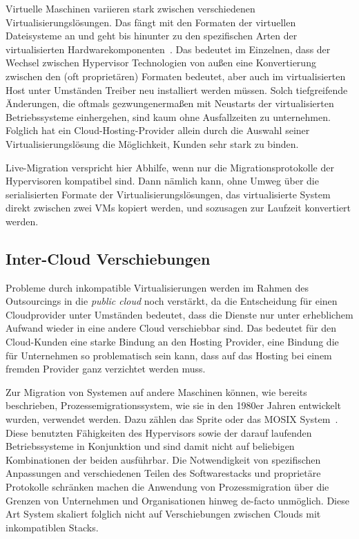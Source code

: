 Virtuelle Maschinen variieren stark zwischen verschiedenen
Virtualisierungslösungen. Das fängt mit den Formaten der virtuellen
Dateisysteme an und geht bis hinunter zu den spezifischen Arten der
virtualisierten Hardwarekomponenten~\cite{nelson2005fast}. Das
bedeutet im Einzelnen, dass der Wechsel zwischen Hypervisor
Technologien von außen eine Konvertierung zwischen den (oft
proprietären) Formaten bedeutet, aber auch im virtualisierten Host
unter Umständen Treiber neu installiert werden müssen. Solch
tiefgreifende Änderungen, die oftmals gezwungenermaßen mit Neustarts
der virtualisierten Betriebssysteme einhergehen, sind kaum ohne
Ausfallzeiten zu unternehmen. Folglich hat ein Cloud-Hosting-Provider
allein durch die Auswahl seiner Virtualisierungslösung die
Möglichkeit, Kunden sehr stark zu binden.

Live-Migration verspricht hier Abhilfe, wenn nur die
Migrationsprotokolle der Hypervisoren kompatibel sind. Dann nämlich
kann, ohne Umweg über die serialisierten Formate der
Virtualisierungslösungen, das virtualisierte System direkt zwischen
zwei \acp{VM} kopiert werden, und sozusagen zur Laufzeit konvertiert
werden.

\subsection{Inter-Cloud Verschiebungen}
\label{sec:movclouds}
Probleme durch inkompatible Virtualisierungen werden im Rahmen des
Outsourcings in die \emph{public cloud} noch verstärkt, da die
Entscheidung für einen Cloudprovider unter Umständen bedeutet, dass
die Dienste nur unter erheblichem Aufwand wieder in eine andere Cloud
verschiebbar sind. Das bedeutet für den Cloud-Kunden eine starke
Bindung an den Hosting Provider, eine Bindung die für Unternehmen so
problematisch sein kann, dass auf das Hosting bei einem fremden
Provider ganz verzichtet werden muss.

Zur Migration von Systemen auf andere Maschinen können, wie bereits
beschrieben, Prozessemigrationssystem, wie sie in den 1980er Jahren
entwickelt wurden, verwendet werden. Dazu zählen \zB das Sprite oder
das MOSIX System~\cite{hansen2004self}. Diese benutzten Fähigkeiten
des Hypervisors sowie der darauf laufenden Betriebssysteme in
Konjunktion und sind damit nicht auf beliebigen Kombinationen der
beiden ausführbar. Die Notwendigkeit von spezifischen Anpassungen and
verschiedenen Teilen des Softwarestacks und proprietäre Protokolle
schränken machen die Anwendung von Prozessmigration über die Grenzen
von Unternehmen und Organisationen hinweg de-facto unmöglich. Diese
Art System skaliert folglich nicht auf Verschiebungen zwischen Clouds
mit inkompatiblen Stacks.

